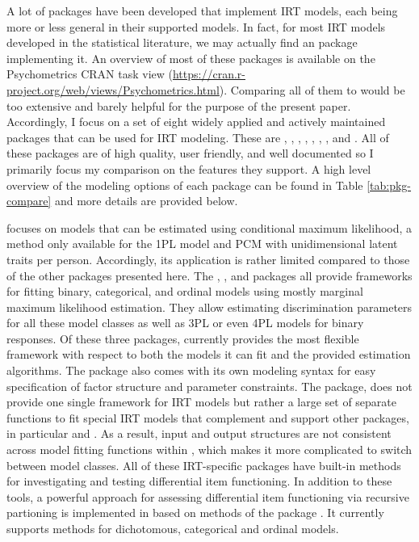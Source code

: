 \documentclass[jss]{jss}
\begin{document}
A lot of  packages have been developed that implement IRT
models, each being more or less general in their supported models. In
fact, for most IRT models developed in the statistical literature, we
may actually find an  package implementing it. An overview
of most of these packages is available on the Psychometrics CRAN task
view (\url{https://cran.r-project.org/web/views/Psychometrics.html}).
Comparing all of them to  would be too extensive and barely
helpful for the purpose of the present paper. Accordingly, I focus on a
set of eight widely applied and actively maintained packages that can be
used for IRT modeling. These are  \citep{eRm}, 
\citep{ltm},  \citep{TAM},  \citep{mirt}, 
\citep{sirt},  \citep{lme4},  \citep{lavaan}, and
 \citep{blavaan}. All of these packages are of high
quality, user friendly, and well documented so I primarily focus my
comparison on the features they support. A high level overview of the
modeling options of each package can be found in Table
\ref{tab:pkg-compare} and more details are provided below.

 focuses on models that can be estimated using conditional
maximum likelihood, a method only available for the 1PL model and PCM
with unidimensional latent traits per person. Accordingly, its
application is rather limited compared to those of the other packages
presented here. The , , and  packages all
provide frameworks for fitting binary, categorical, and ordinal models
using mostly marginal maximum likelihood estimation. They allow
estimating discrimination parameters for all these model classes as well
as 3PL or even 4PL models for binary responses. Of these three packages,
 currently provides the most flexible framework with respect
to both the models it can fit and the provided estimation algorithms.
The package also comes with its own modeling syntax for easy
specification of factor structure and parameter constraints. The
 package, does not provide one single framework for IRT models
but rather a large set of separate functions to fit special IRT models
that complement and support other packages, in particular  and
. As a result, input and output structures are not consistent
across model fitting functions within , which makes it more
complicated to switch between model classes. All of these IRT-specific
packages have built-in methods for investigating and testing
differential item functioning. In addition to these tools, a powerful
approach for assessing differential item functioning via recursive
partioning is implemented in 
\citep{psychotree1, psychotree2} based on methods of the
 package \citep{psychotools}. It currently supports
methods for dichotomous, categorical and ordinal models.
\end{document}
